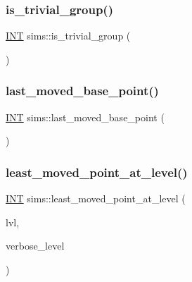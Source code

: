 \mbox{\label{classsims_a2ce587ea215dec9f0f30db8fe3ebfee1}} 
\subsubsection{\texorpdfstring{is\+\_\+trivial\+\_\+group()}{is\_trivial\_group()}}
{\footnotesize\ttfamily \mbox{\hyperlink{galois_8h_a09fddde158a3a20bd2dcadb609de11dc}{I\+NT}} sims\+::is\+\_\+trivial\+\_\+group (\begin{DoxyParamCaption}{ }\end{DoxyParamCaption})}

\mbox{\label{classsims_ab7549d6212df09ad5fdcc8b5edbe8806}} 
\subsubsection{\texorpdfstring{last\+\_\+moved\+\_\+base\+\_\+point()}{last\_moved\_base\_point()}}
{\footnotesize\ttfamily \mbox{\hyperlink{galois_8h_a09fddde158a3a20bd2dcadb609de11dc}{I\+NT}} sims\+::last\+\_\+moved\+\_\+base\+\_\+point (\begin{DoxyParamCaption}{ }\end{DoxyParamCaption})}

\mbox{\label{classsims_adfd9026256dd9d0ace0ebb56eff33498}} 
\subsubsection{\texorpdfstring{least\+\_\+moved\+\_\+point\+\_\+at\+\_\+level()}{least\_moved\_point\_at\_level()}}
{\footnotesize\ttfamily \mbox{\hyperlink{galois_8h_a09fddde158a3a20bd2dcadb609de11dc}{I\+NT}} sims\+::least\+\_\+moved\+\_\+point\+\_\+at\+\_\+level (\begin{DoxyParamCaption}\item[{\mbox{\hyperlink{galois_8h_a09fddde158a3a20bd2dcadb609de11dc}{I\+NT}}}]{lvl,  }\item[{\mbox{\hyperlink{galois_8h_a09fddde158a3a20bd2dcadb609de11dc}{I\+NT}}}]{verbose\+\_\+level }\end{DoxyParamCaption})}

